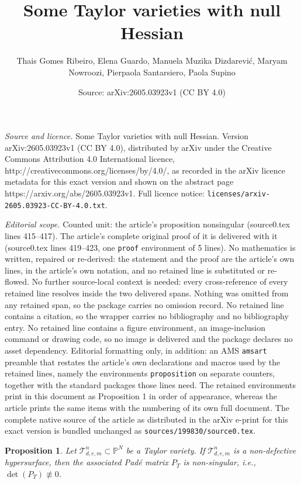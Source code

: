 \documentclass[10pt,a4paper]{amsart}
\title{Some Taylor varieties with null Hessian}
\author{Thais Gomes Ribeiro, Elena Guardo, Manuela Muzika Dizdarevi\'c, Maryam Nowroozi, Pierpaola Santarsiero, Paola Supino}
\date{Source: arXiv:2605.03923v1 (CC BY 4.0)}
\newtheorem{proposition}{Proposition}
\begin{document}
\maketitle

\noindent\emph{Source and licence.} Some Taylor varieties with null Hessian. Version arXiv:2605.03923v1 (CC BY 4.0), distributed by arXiv under the Creative Commons Attribution 4.0 International licence, http://creativecommons.org/licenses/by/4.0/, as recorded in the arXiv licence metadata for this exact version and shown on the abstract page https://arxiv.org/abs/2605.03923v1. Full licence notice: \texttt{licenses/arxiv-2605.03923-CC-BY-4.0.txt}.\par\smallskip

\noindent\textit{Editorial scope.} Counted unit: the article's proposition nonsingular (source0.tex lines 415--417). The article's complete original proof of it is delivered with it (source0.tex lines 419--423, one \texttt{proof} environment of 5 lines). No mathematics is written, repaired or re-derived: the statement and the proof are the article's own lines, in the article's own notation, and no retained line is substituted or re-flowed.  No further source-local context is needed: every cross-reference of every retained line resolves inside the two delivered spans.  Nothing was omitted from any retained span, so the package carries no omission record.  No retained line contains a citation, so the wrapper carries no bibliography and no bibliography entry.  No retained line contains a figure environment, an image-inclusion command or drawing code, so no image is delivered and the package declares no asset dependency.  Editorial formatting only, in addition: an AMS \texttt{amsart} preamble that restates the article's own declarations and macros used by the retained lines, namely the environments \texttt{proposition} on separate counters, together with the standard packages those lines need.  The retained environments print in this document as Proposition 1 in order of appearance, whereas the article prints the same items with the numbering of its own full document.  The complete native source of the article as distributed in the arXiv e-print for this exact version is bundled unchanged as \texttt{sources/199830/source0.tex}.
\begin{proposition}\label{nonsingular}
Let $\mathcal{T}^{n}_{d,e,m} \subset \mathbb{P}^N$ be a Taylor variety. If $\mathcal{T}^{n}_{d,e,m}$ is a non-defective hypersurface, then the associated Padé matrix $P_T$ is non-singular, i.e., $\det(P_T) \not\equiv 0$.
\end{proposition}
\end{document}
